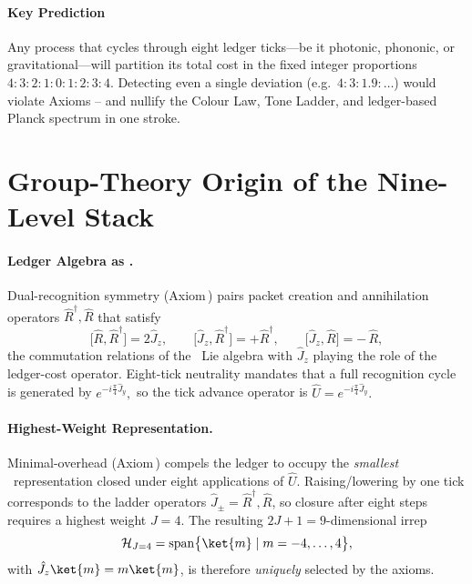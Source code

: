 \documentclass[11pt,oneside]{book}
\begin{document}
{\paragraph*{Key Prediction}

Any process that cycles through eight ledger ticks—be it photonic,
phononic, or gravitational—will partition its total cost in the fixed
integer proportions
\(4{:}3{:}2{:}1{:}0{:}1{:}2{:}3{:}4\).
Detecting even a single deviation (e.g.\ $4{:}3{:}1.9{:}\dots$) would
violate Axioms – and nullify the Colour Law,
Tone Ladder, and ledger-based Planck spectrum in one stroke.


\section{Group-Theory Origin of the Nine-Level Stack}
\label{sec:unity-geometry}

\paragraph{Ledger Algebra as \SUtwo.}
Dual-recognition symmetry (Axiom\,) pairs packet creation and
annihilation operators \(\hat R^{\dagger},\hat R\) that satisfy
\[
   \bigl[\hat R,\hat R^{\dagger}\bigr]=2\hat J_{z},
   \qquad
   \bigl[\hat J_{z},\hat R^{\dagger}\bigr]=+\hat R^{\dagger},
   \qquad
   \bigl[\hat J_{z},\hat R\bigr]=-\,\hat R,
\]
the commutation relations of the \SUtwo\ Lie algebra with
\(\hat J_{z}\) playing the role of the ledger-cost operator.  
Eight-tick neutrality mandates that a full recognition cycle is
generated by
\(
   e^{-i\frac{\pi}{4}\hat J_{y}},
\)
so the tick advance operator is
\(
   \hat U=e^{-i\frac{\pi}{4}\hat J_{y}}.
\)

\paragraph{Highest-Weight Representation.}
Minimal-overhead (Axiom\,) compels the ledger to occupy the
\emph{smallest} \SUtwo\ representation closed under eight
applications of \(\hat U\).
Raising/lowering by one tick corresponds to the ladder operators
\(\hat J_{\pm}=\hat R^{\dagger},\hat R\), so closure after eight steps
requires a highest weight \(J=4\).
The resulting $2J{+}1=9$-dimensional irrep
\[
   \mathcal H_{J=4}
   =
   \operatorname{span}\bigl\{
      \ket{m}\;|\;m=-4,\dots,4
   \bigr\},
\]
with \(\hat J_{z}\ket{m}=m\ket{m}\),
is therefore \emph{uniquely} selected by the axioms.

}
\end{document}
